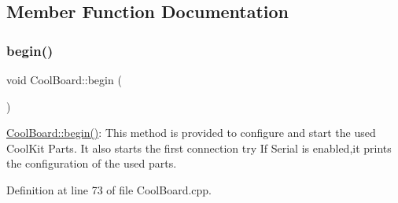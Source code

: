 \subsection{Member Function Documentation}
\mbox{\label{class_cool_board_acba7c5aef7268b2c0044bdb54d3b9d76}} 
\subsubsection{\texorpdfstring{begin()}{begin()}}
{\footnotesize\ttfamily void Cool\+Board\+::begin (\begin{DoxyParamCaption}{ }\end{DoxyParamCaption})}

\hyperlink{class_cool_board_acba7c5aef7268b2c0044bdb54d3b9d76}{Cool\+Board\+::begin()}\+: This method is provided to configure and start the used Cool\+Kit Parts. It also starts the first connection try If Serial is enabled,it prints the configuration of the used parts. 

Definition at line 73 of file Cool\+Board.\+cpp.


